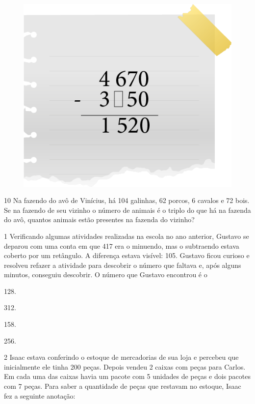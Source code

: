 \begin{figure}[htpb!]
\centering
\includegraphics[width=.5\textwidth]{media/image16.png}
\end{figure}


\num{10} Na fazendo do avô de Vinícius, há 104 galinhas, 62 porcos, 6 cavalos e 72
bois. Se na fazendo de seu vizinho o número de animais é o triplo do que
há na fazenda do avô, quantos animais estão presentes na fazenda do
vizinho?

\begin{mdframed}[linewidth=2pt,linecolor=salmao,roundcorner=2pt]

\vspace{1cm}
\end{mdframed}


\num{1} Verificando algumas atividades realizadas na escola no ano anterior,
Gustavo se deparou com uma conta em que 417 era o minuendo, mas o subtraendo
estava coberto por um retângulo. A diferença estava visível: 105.
Gustavo ficou curioso e resolveu refazer a atividade para descobrir o
número que faltava e, após alguns minutos, conseguiu descobrir. O número
que Gustavo encontrou é o

\begin{multicols}{2}
\begin{escolha}
\item
  128.
\item
  312.
\item
  158.
\item
  256.
\end{escolha}
\end{multicols}

\num{2} Isaac estava conferindo o estoque de mercadorias de sua loja e percebeu
que inicialmente ele tinha 200 peças. Depois vendeu 2 caixas com peças
para Carlos. Em cada uma das caixas havia um pacote com 5 unidades de peças e dois
pacotes com 7 peças. Para saber a quantidade de peças que restavam no estoque, Isaac fez a
seguinte anotação:

